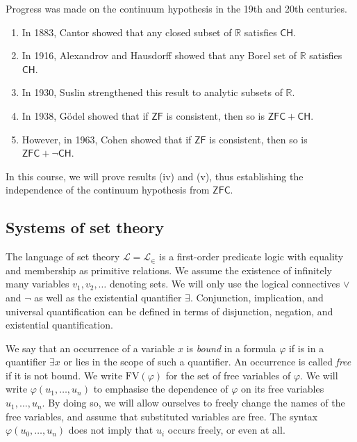Progress was made on the continuum hypothesis in the 19th and 20th centuries.
\begin{enumerate}
    \item In 1883, Cantor showed that any closed subset of \( \mathbb R \) satisfies \( \mathsf{CH} \).
    \item In 1916, Alexandrov and Hausdorff showed that any Borel set of \( \mathbb R \) satisfies \( \mathsf{CH} \).
    \item In 1930, Suslin strengthened this result to analytic subsets of \( \mathbb R \).
    \item In 1938, G\"odel showed that if \( \mathsf{ZF} \) is consistent, then so is \( \mathsf{ZFC} + \mathsf{CH} \).
    \item However, in 1963, Cohen showed that if \( \mathsf{ZF} \) is consistent, then so is \( \mathsf{ZFC} + \neg\mathsf{CH} \).
\end{enumerate}
In this course, we will prove results (iv) and (v), thus establishing the independence of the continuum hypothesis from \( \mathsf{ZFC} \).

\subsection{Systems of set theory}
The language of set theory \( \mathcal L = \mathcal L_\in \) is a first-order predicate logic with equality and membership as primitive relations.
We assume the existence of infinitely many variables \( v_1, v_2, \dots \) denoting sets.
We will only use the logical connectives \( \vee \) and \( \neg \) as well as the existential quantifier \( \exists \).
Conjunction, implication, and universal quantification can be defined in terms of disjunction, negation, and existential quantification.

We say that an occurrence of a variable \( x \) is \emph{bound} in a formula \( \varphi \) if is in a quantifier \( \exists x \) or lies in the scope of such a quantifier.
An occurrence is called \emph{free} if it is not bound.
We write \( \mathrm{FV}(\varphi) \) for the set of free variables of \( \varphi \).
We will write \( \varphi(u_1, \dots, u_n) \) to emphasise the dependence of \( \varphi \) on its free variables \( u_1, \dots, u_n \).
By doing so, we will allow ourselves to freely change the names of the free variables, and assume that substituted variables are free.
The syntax \( \varphi(u_0, \dots, u_n) \) does not imply that \( u_i \) occurs freely, or even at all.

